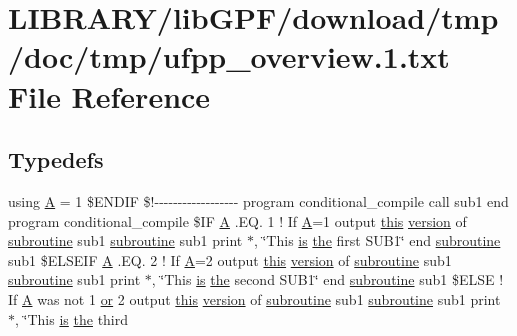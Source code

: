 \hypertarget{ufpp__overview_81_8txt}{}\section{L\+I\+B\+R\+A\+R\+Y/lib\+G\+P\+F/download/tmp/doc/tmp/ufpp\+\_\+overview.1.txt File Reference}
\label{ufpp__overview_81_8txt}
\subsection*{Typedefs}
\begin{DoxyCompactItemize}
\item 
using \hyperlink{ufpp__overview_81_8txt_a8341271e5f4e3003f6eb1c9547fc9d1a}{A} = 1 \$E\+N\+D\+IF \$!-\/-\/-\/-\/-\/-\/-\/-\/-\/-\/-\/-\/-\/-\/-\/-\/-\/-\/ program conditional\+\_\+compile call sub1 end program conditional\+\_\+compile \$IF \hyperlink{ufpp__overview_81_8txt_a8341271e5f4e3003f6eb1c9547fc9d1a}{A} .E\+Q. 1 ! If \hyperlink{ufpp__overview_81_8txt_a8341271e5f4e3003f6eb1c9547fc9d1a}{A}=1 output \hyperlink{M__stopwatch_83_8txt_ad62a52042bb610eee5b36b5516caec22}{this} \hyperlink{inquiry__stopwatch_83_8txt_aee378be19d20935dd436517beda00ee4}{version} of \hyperlink{M__stopwatch_83_8txt_acfbcff50169d691ff02d4a123ed70482}{subroutine} sub1 \hyperlink{M__stopwatch_83_8txt_acfbcff50169d691ff02d4a123ed70482}{subroutine} sub1 print $\ast$, \char`\"{}This \hyperlink{intro__blas1_83_8txt_a42a91df93f840595de3019ceb5d1df23}{is} \hyperlink{M__stopwatch_83_8txt_a0f266597de2e57eb3aa964927bb30e14}{the} first S\+U\+B1\char`\"{} end \hyperlink{M__stopwatch_83_8txt_acfbcff50169d691ff02d4a123ed70482}{subroutine} sub1 \$E\+L\+S\+E\+IF \hyperlink{ufpp__overview_81_8txt_a8341271e5f4e3003f6eb1c9547fc9d1a}{A} .E\+Q. 2 ! If \hyperlink{ufpp__overview_81_8txt_a8341271e5f4e3003f6eb1c9547fc9d1a}{A}=2 output \hyperlink{M__stopwatch_83_8txt_ad62a52042bb610eee5b36b5516caec22}{this} \hyperlink{inquiry__stopwatch_83_8txt_aee378be19d20935dd436517beda00ee4}{version} of \hyperlink{M__stopwatch_83_8txt_acfbcff50169d691ff02d4a123ed70482}{subroutine} sub1 \hyperlink{M__stopwatch_83_8txt_acfbcff50169d691ff02d4a123ed70482}{subroutine} sub1 print $\ast$, \char`\"{}This \hyperlink{intro__blas1_83_8txt_a42a91df93f840595de3019ceb5d1df23}{is} \hyperlink{M__stopwatch_83_8txt_a0f266597de2e57eb3aa964927bb30e14}{the} second S\+U\+B1\char`\"{} end \hyperlink{M__stopwatch_83_8txt_acfbcff50169d691ff02d4a123ed70482}{subroutine} sub1 \$E\+L\+SE ! If \hyperlink{ufpp__overview_81_8txt_a8341271e5f4e3003f6eb1c9547fc9d1a}{A} was not 1 \hyperlink{what__overview_81_8txt_a93f5d39a36ed511cc0dc88a20a517388}{or} 2 output \hyperlink{M__stopwatch_83_8txt_ad62a52042bb610eee5b36b5516caec22}{this} \hyperlink{inquiry__stopwatch_83_8txt_aee378be19d20935dd436517beda00ee4}{version} of \hyperlink{M__stopwatch_83_8txt_acfbcff50169d691ff02d4a123ed70482}{subroutine} sub1 \hyperlink{M__stopwatch_83_8txt_acfbcff50169d691ff02d4a123ed70482}{subroutine} sub1 print $\ast$, \char`\"{}This \hyperlink{intro__blas1_83_8txt_a42a91df93f840595de3019ceb5d1df23}{is} \hyperlink{M__stopwatch_83_8txt_a0f266597de2e57eb3aa964927bb30e14}{the} third 
\end{DoxyCompactItemize}
